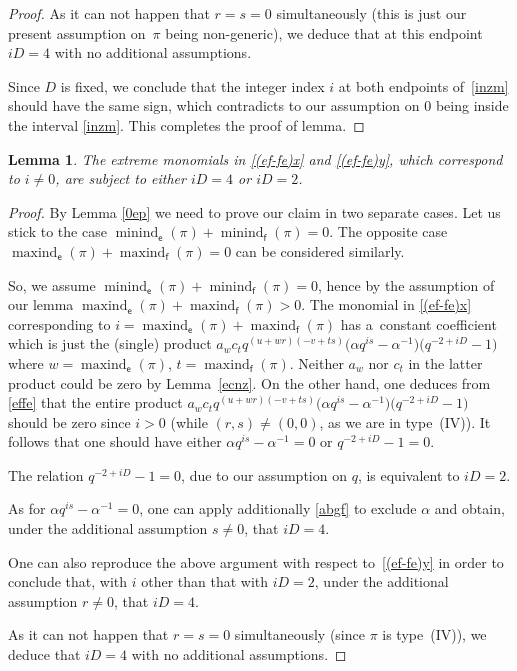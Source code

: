\documentclass[pdftex]{sigma}
\numberwithin{equation}{section}
\newtheorem{Lemma}[Theorem]{Lemma}
\begin{document}
\begin{proof}
As it can not happen that $r=s=0$ simultaneously (this is just our present assumption on~$\pi$ being non-generic), we deduce that at this endpoint $iD=4$ with no additional assumptions.

Since $D$ is fixed, we conclude that the integer index $i$ at both endpoints of~\eqref{inzm} should have the same sign, which contradicts to our assumption on $0$ being inside the interval \eqref{inzm}. This completes the proof of lemma.
\end{proof}

\begin{Lemma}\label{iD}The extreme monomials in \eqref{(ef-fe)x} and \eqref{(ef-fe)y}, which correspond to $i\ne 0$, are subject to either $iD=4$ or $iD=2$.
\end{Lemma}

\begin{proof} By Lemma \ref{0ep} we need to prove our claim in two separate cases. Let us stick to the case $\operatorname{minind}_\mathsf{e}(\pi)+\operatorname{minind}_\mathsf{f}(\pi)=0$. The opposite case $\operatorname{maxind}_\mathsf{e}(\pi)+\operatorname{maxind}_\mathsf{f}(\pi)=0$ can be considered similarly.

So, we assume $\operatorname{minind}_\mathsf{e}(\pi)+\operatorname{minind}_\mathsf{f}(\pi) =0$, hence by the assumption of our lemma \linebreak $\operatorname{maxind}_\mathsf{e}(\pi)+\operatorname{maxind}_\mathsf{f}(\pi)>0$. The monomial in \eqref{(ef-fe)x} corresponding to $i=\operatorname{maxind}_\mathsf{e}(\pi)+ \operatorname{maxind}_\mathsf{f}(\pi)$ has a~constant coefficient which is just the (single) product $a_wc_tq^{(u+wr)(-v+ts)}\big(\alpha q^{is}-\alpha^{-1}\big)\big(q^{-2+iD}-1\big)$ where $w=\operatorname{maxind}_\mathsf{e}(\pi)$, $t=\operatorname{maxind}_\mathsf{f}(\pi)$. Neither $a_w$ nor $c_t$ in the latter product could be zero by Lemma~\ref{ecnz}. On the other hand, one deduces from \eqref{effe} that the entire product $a_wc_tq^{(u+wr)(-v+ts)}\big(\alpha q^{is}-\alpha^{-1}\big)\big(q^{-2+iD}-1\big)$ should be zero since $i>0$ (while $(r,s)\ne(0,0)$, as we are in type~(IV)). It follows that one should have either $\alpha q^{is}-\alpha^{-1}=0$ or $q^{-2+iD}-1=0$.

The relation $q^{-2+iD}-1=0$, due to our assumption on $q$, is equivalent to $iD=2$.

As for $\alpha q^{is}-\alpha^{-1}=0$, one can apply additionally \eqref{abgf} to exclude $\alpha$ and obtain, under the additional assumption $s\ne 0$, that $iD=4$.

One can also reproduce the above argument with respect to~\eqref{(ef-fe)y} in order to conclude that, with $i$ other than that with $iD=2$, under the additional assumption $r\ne 0$, that $iD=4$.

As it can not happen that $r=s=0$ simultaneously (since $\pi$ is type~(IV)), we deduce that $iD=4$ with no additional assumptions.
\end{proof}
\end{document}
